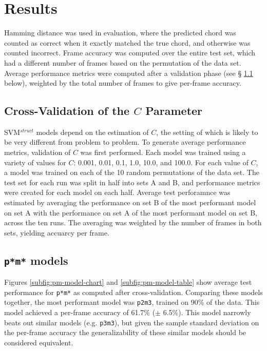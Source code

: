 \section{Results}

Hamming distance was used in evaluation, where the predicted chord was counted
as correct when it exactly matched the true chord, and otherwise was counted
incorrect. Frame accuracy was computed over the entire test set, which had
a different number of frames based on the permutation of the data set. Average
performance metrics were computed after a validation phase (see \S
\ref{ssec:cross-validation} below), weighted by the total number of frames to
give per-frame accuracy.

\subsection{Cross-Validation of the $C$ Parameter}
\label{ssec:cross-validation}

SVM$^{struct}$ models depend on the estimation of $C$, the setting of which is
likely to be very different from problem to problem. To generate average
performance metrics, validation of $C$ was first performed. Each model was
trained using a variety of values for $C$: 0.001, 0.01, 0.1, 1.0, 10.0, and
100.0. For each value of $C$, a model was trained on each of the 10 random
permutations of the data set. The test set for each run was split in half into
sets A and B, and performance metrics were created for each model on each half.
Average test perforamnce was estimated by averaging the performance on set B of
the most performant model on set A with the performance on set A of the most
performant model on set B, across the ten runs. The averaging was weighted by
the number of frames in both sets, yielding accuarcy per frame.

\subsection{\texttt{p*m*} models}
\label{ssec:pm-models}

Figures \ref{subfig:pm-model-chart} and \ref{subfig:pm-model-table} show
average test performance for \texttt{p*m*} as computed after cross-validation.
Comparing these models together, the most performant model was \texttt{p2m3},
trained on 90\% of the data. This model achieved a per-frame accuracy of 61.7\%
($\pm$ 6.5\%). This model narrowly beats out similar models (e.g.
\texttt{p3m3}), but given the sample standard deviation on the per-frame
accuracy the generalizability of these similar models should be considered
equivalent.

